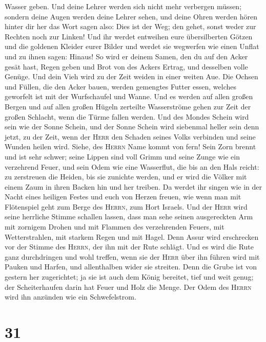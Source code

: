 Wasser geben. Und deine Lehrer werden sich nicht mehr verbergen müssen;
sondern deine Augen werden deine Lehrer sehen,  und deine
Ohren werden hören hinter dir her das Wort sagen also: Dies ist der Weg;
den gehet, sonst weder zur Rechten noch zur Linken!  Und
ihr werdet entweihen eure übersilberten Götzen und die goldenen Kleider
eurer Bilder und werdet sie wegwerfen wie einen Unflat und zu ihnen
sagen: Hinaus!  So wird er deinem Samen, den du auf den
Acker gesät hast, Regen geben und Brot von des Ackers Ertrag, und
desselben volle Genüge. Und dein Vieh wird zu der Zeit weiden in einer
weiten Aue.  Die Ochsen und Füllen, die den Acker bauen,
werden gemengtes Futter essen, welches geworfelt ist mit der
Wurfschaufel und Wanne.  Und es werden auf allen großen
Bergen und auf allen großen Hügeln zerteilte Wasserströme gehen zur Zeit
der großen Schlacht, wenn die Türme fallen werden.  Und
des Mondes Schein wird sein wie der Sonne Schein, und der Sonne Schein
wird siebenmal heller sein denn jetzt, zu der Zeit, wenn der
\textsc{Herr} den Schaden seines Volks verbinden und seine Wunden heilen
wird.  Siehe, des \textsc{Herrn} Name kommt von fern!
Sein Zorn brennt und ist sehr schwer; seine Lippen sind voll Grimm und
seine Zunge wie ein verzehrend Feuer,  und sein Odem wie
eine Wasserflut, die bis an den Hals reicht: zu zerstreuen die Heiden,
bis sie zunichte werden, und er wird die Völker mit einem Zaum in ihren
Backen hin und her treiben.  Da werdet ihr singen wie in
der Nacht eines heiligen Festes und euch von Herzen freuen, wie wenn man
mit Flötenspiel geht zum Berge des \textsc{Herrn}, zum Hort Israels.
 Und der \textsc{Herr} wird seine herrliche Stimme
schallen lassen, dass man sehe seinen ausgereckten Arm mit zornigem
Drohen und mit Flammen des verzehrenden Feuers, mit Wetterstrahlen, mit
starkem Regen und mit Hagel.  Denn Assur wird erschrecken
vor der Stimme des \textsc{Herrn}, der ihn mit der Rute schlägt.
 Und es wird die Rute ganz durchdringen und wohl treffen,
wenn sie der \textsc{Herr} über ihn führen wird mit Pauken und Harfen,
und allenthalben wider sie streiten.  Denn die Grube ist
von gestern her zugerichtet; ja sie ist auch dem König bereitet, tief
und weit genug; der Scheiterhaufen darin hat Feuer und Holz die Menge.
Der Odem des \textsc{Herrn} wird ihn anzünden wie ein Schwefelstrom.

\hypertarget{section-30}{%
\section{31}\label{section-30}}

